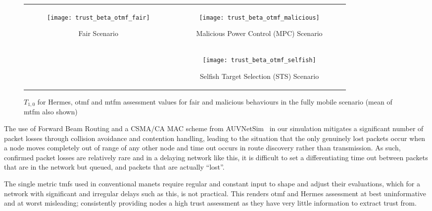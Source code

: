 \begin{figure*}[t]
	\centering
	\begin{tabular}{cc}
		\multirow{2}{*}{
			\begin{subfigure}{0.5\textwidth}	
				\texttt{[image: trust\_beta\_otmf\_fair]}
				\caption{Fair Scenario}
				\label{fig:all_mobile_fair_beta}
			\end{subfigure}
		}&
		\begin{subfigure}{0.5\textwidth}
			\texttt{[image: trust\_beta\_otmf\_malicious]} 
			\caption{Malicious Power Control (MPC) Scenario}
			\label{fig:all_mobile_badmouthing_beta}
		\end{subfigure} \\
		&
		\begin{subfigure}{0.5\textwidth}	
			\texttt{[image: trust\_beta\_otmf\_selfish]} 
			\caption{Selfish Target Selection (STS) Scenario}
			\label{fig:all_mobile_selfish_beta}
		\end{subfigure}
	\end{tabular}
	\caption{$T_{1,0}$ for Hermes, \gls{otmf} and \gls{mtfm} assessment values for fair and malicious behaviours in the fully mobile scenario (mean of \gls{mtfm} also shown)}
	\label{fig:otmf_beta_comparison}
\end{figure*}
%
The use of Forward Beam Routing and a CSMA/CA MAC scheme from AUVNetSim~\cite{Miquel2008} in our simulation mitigates a significant number of packet losses through collision avoidance and contention handling, leading to the situation that the only genuinely lost packets occur when a node moves completely out of range of any other node and time out occurs in route discovery rather than transmission.
As such, confirmed packet losses are relatively rare and in a delaying network like this, it is difficult to set a differentiating time out between packets that are in the network but queued, and packets that are actually ``lost''.

The single metric \glspl{tmf} used in conventional \gls{manet}s require regular and constant input to shape and adjust their evaluations, which for a network with significant and irregular delays such as this, is not practical.
This renders \gls{otmf} and Hermes assessment at best uninformative and at worst misleading; consistently providing nodes a high trust assessment as they have very little information to extract trust from. 

